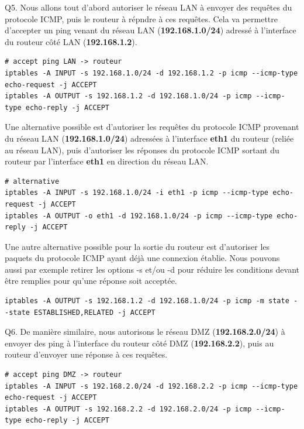 \documentclass[frenchb, 11pt]{article}
\newlength{\leftbarwidth}
\newlength{\leftbarsep}
\newcommand*{\leftbarcolorcmd}{\color{leftbarcolor}} %
\renewenvironment{leftbar}{%
    \def\FrameCommand{{\leftbarcolorcmd{\vrule width \leftbarwidth\relax\hspace {\leftbarsep}}}}%
    \MakeFramed {\advance \hsize -\width \FrameRestore }%
}{%
    \endMakeFramed
}
\begin{document}
\begin{leftbar}
	\noindent Q5. Nous allons tout d'abord autoriser le réseau LAN à envoyer des requêtes du protocole ICMP, puis le routeur à répndre à ces requêtes. Cela va permettre d'accepter un ping venant du réseau LAN (\textbf{192.168.1.0/24}) adressé à l'interface du routeur côté LAN (\textbf{192.168.1.2}).
	\begin{lstlisting}[numbers=none]
# accept ping LAN -> routeur
iptables -A INPUT -s 192.168.1.0/24 -d 192.168.1.2 -p icmp --icmp-type echo-request -j ACCEPT
iptables -A OUTPUT -s 192.168.1.2 -d 192.168.1.0/24 -p icmp --icmp-type echo-reply -j ACCEPT
	\end{lstlisting}
	\hfill

	\noindent Une alternative possible est d'autoriser les requêtes du protocole ICMP provenant du réseau LAN (\textbf{192.168.1.0/24}) adressées à l'interface \textbf{eth1} du routeur (reliée au réseau LAN), puis d'autoriser les réponses du protocole ICMP sortant du routeur par l'interface \textbf{eth1} en direction du réseau LAN.
	\begin{lstlisting}[numbers=none]
# alternative
iptables -A INPUT -s 192.168.1.0/24 -i eth1 -p icmp --icmp-type echo-request -j ACCEPT
iptables -A OUTPUT -o eth1 -d 192.168.1.0/24 -p icmp --icmp-type echo-reply -j ACCEPT
	\end{lstlisting}
	\hfill

	\noindent Une autre alternative possible pour la sortie du routeur est d'autoriser les paquets du protocole ICMP ayant déjà une connexion établie. Nous pouvons aussi par exemple retirer les options -s et/ou -d pour réduire les conditions devant être remplies pour qu'une réponse soit acceptée.
	\begin{lstlisting}[numbers=none]
iptables -A OUTPUT -s 192.168.1.2 -d 192.168.1.0/24 -p icmp -m state --state ESTABLISHED,RELATED -j ACCEPT
	\end{lstlisting}
\end{leftbar}

\begin{leftbar}
	\noindent Q6. De manière similaire, nous autorisons le réseau DMZ (\textbf{192.168.2.0/24}) à envoyer des ping à l'interface du routeur côté DMZ (\textbf{192.168.2.2}), puis au routeur d'envoyer une réponse à ces requêtes.
	\begin{lstlisting}[numbers=none]
# accept ping DMZ -> routeur
iptables -A INPUT -s 192.168.2.0/24 -d 192.168.2.2 -p icmp --icmp-type echo-request -j ACCEPT
iptables -A OUTPUT -s 192.168.2.2 -d 192.168.2.0/24 -p icmp --icmp-type echo-reply -j ACCEPT
	\end{lstlisting}
\end{leftbar}
\end{document}
